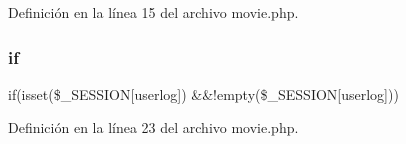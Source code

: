 Definición en la línea 15 del archivo movie.\+php.

\mbox{\label{movie_8php_aefb5893336d7ead40ae915367f4b82cc}} 
\subsubsection{\texorpdfstring{if}{if}}
{\footnotesize\ttfamily if(isset(\$\+\_\+\+S\+E\+S\+S\+I\+ON\mbox{[}\textquotesingle{}userlog\textquotesingle{}\mbox{]}) \&\&!empty(\$\+\_\+\+S\+E\+S\+S\+I\+ON\mbox{[}\textquotesingle{}userlog\textquotesingle{}\mbox{]}))}



Definición en la línea 23 del archivo movie.\+php.

